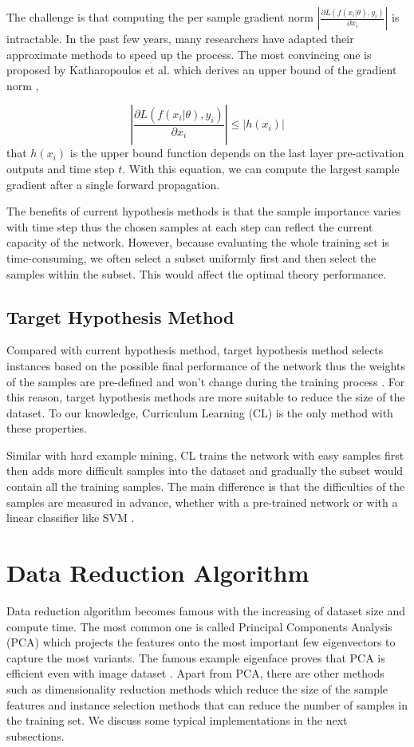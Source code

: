 The challenge is that computing the per sample gradient norm $|\frac{\partial{L(f(x_i|\theta), y_i)}}{\partial{x_i}}|$ is intractable. In the past few years, many researchers have adapted their approximate methods to speed up the process. The most convincing one is proposed by Katharopoulos et al. which derives an upper bound of the gradient norm \cite{Katharopoulos2018},

\begin{equation}
	|\frac{\partial{L(f(x_i|\theta), y_i)}}{\partial{x_i}}|  \leq |h(x_i)|\end{equation}
that $h(x_i)$ is the upper bound function depends on the last layer pre-activation outputs and time step $t$. With this equation, we can compute the largest sample gradient after a single forward propagation.

The benefits of current hypothesis methods is that the sample importance varies with time step thus the chosen samples at each step can reflect the current capacity of the network. However, because evaluating the whole training set is time-consuming, we often select a subset uniformly first and then select the samples within the subset. This would affect the optimal theory performance. 

\subsection{Target Hypothesis Method}
Compared with current hypothesis method, target hypothesis method selects instances based on the possible final performance of the network thus the weights of the samples are pre-defined and won't change during the training process \cite{Bengio2009}. For this reason, target hypothesis methods are more suitable to reduce the size of the dataset. To our knowledge, Curriculum Learning (CL) is the only method with these properties.

Similar with hard example mining, CL trains the network with easy samples first then adds more difficult samples into the dataset and gradually the subset would contain all the training samples. The main difference is that the difficulties of the samples are measured in advance, whether with a pre-trained network or with a linear classifier like SVM \cite{Hacohen2019a}. 

\section{Data Reduction Algorithm}
Data reduction algorithm becomes famous with the increasing of dataset size and compute time. The most common one is called Principal Components Analysis (PCA) which projects the features onto the most important few eigenvectors to capture the most variants. The famous example eigenface proves that PCA is efficient even with image dataset \cite{Paul2012}. Apart from PCA, there are other methods such as dimensionality reduction methods which reduce the size of the sample features and instance selection methods that can reduce the number of samples in the training set. We discuss some typical implementations in the next subsections.

